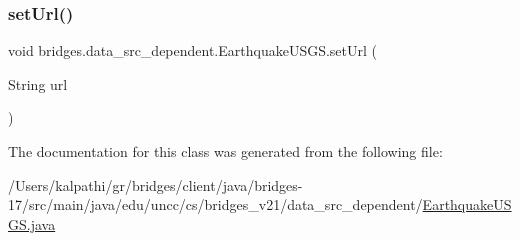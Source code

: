 \mbox{\label{classbridges_1_1data__src__dependent_1_1_earthquake_u_s_g_s_aaa9d26333e7b80d0f72da58ea2ad41d1}} 
\subsubsection{\texorpdfstring{set\+Url()}{setUrl()}}
{\footnotesize\ttfamily void bridges.\+data\+\_\+src\+\_\+dependent.\+Earthquake\+U\+S\+G\+S.\+set\+Url (\begin{DoxyParamCaption}\item[{String}]{url }\end{DoxyParamCaption})}



The documentation for this class was generated from the following file\+:\begin{DoxyCompactItemize}
\item 
/\+Users/kalpathi/gr/bridges/client/java/bridges-\/17/src/main/java/edu/uncc/cs/bridges\+\_\+v21/data\+\_\+src\+\_\+dependent/\mbox{\hyperlink{_earthquake_u_s_g_s_8java}{Earthquake\+U\+S\+G\+S.\+java}}\end{DoxyCompactItemize}
